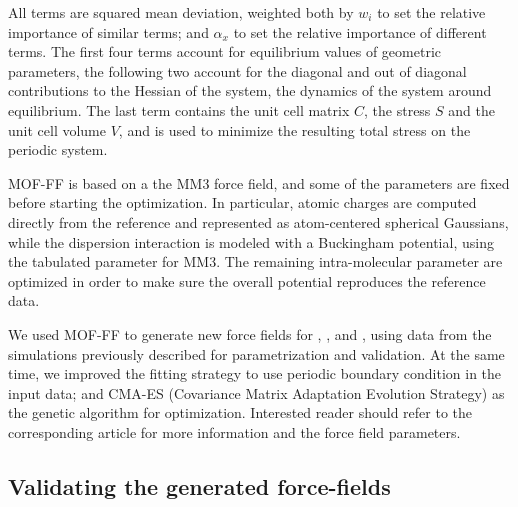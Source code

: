 \documentclass[thesis]{subfiles}
\begin{document}
All terms are squared mean deviation, weighted both by $w_i$ to set the relative
importance of similar terms; and $\alpha_x$ to set the relative importance of
different terms. The first four terms account for equilibrium values of
geometric parameters, the following two account for the diagonal and out of
diagonal contributions to the Hessian of the system, \ie the dynamics of the
system around equilibrium. The last term contains the unit cell matrix $C$, the
stress $S$ and the unit cell volume $V$, and is used to minimize the resulting
total stress on the periodic system.

MOF-FF is based on a the MM3 force field\cite{Allinger1989}, and some of the
parameters are fixed before starting the optimization. In particular, atomic
charges are computed directly from the \abinitio reference and represented as
atom-centered spherical Gaussians, while the dispersion interaction is modeled
with a Buckingham potential, using the tabulated parameter for
MM3\cite{Allinger1994}. The remaining intra-molecular parameter are optimized in
order to make sure the overall potential reproduces the reference data.

We used MOF-FF to generate new force fields for , \ZIFCl, and \ZIFBr,
using data from the simulations previously described for parametrization and
validation. At the same time, we improved the fitting strategy to use periodic
boundary condition in the \abinitio input data; and CMA-ES (Covariance Matrix
Adaptation Evolution Strategy) as the genetic algorithm for optimization.
Interested reader should refer to the corresponding article\cite{DuerholtXXXX}
for more information and the force field parameters.

\subsection{Validating the generated force-fields}
\end{document}
